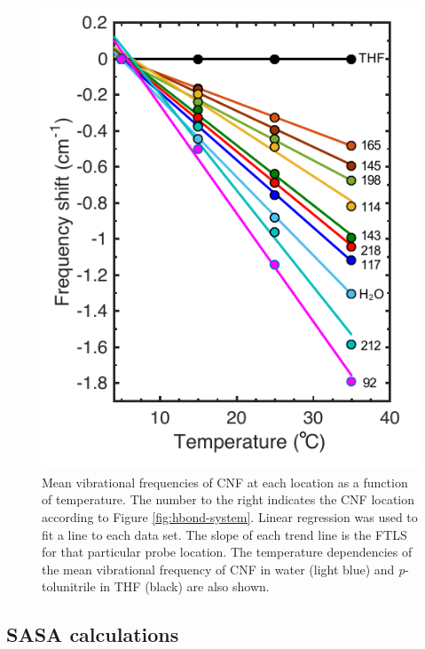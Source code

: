 \begin{figure}
    \center
    \includegraphics[width=\single]{figures-gfp-hbond/FTLS.pdf}
    \caption{
        Mean vibrational frequencies of CNF at each location as a function of temperature. 
        The number to the right indicates the CNF location according to Figure \ref{fig:hbond-system}. 
        Linear regression was used to fit a line to each data set. 
        The slope of each trend line is the FTLS for that particular probe location. 
        The temperature dependencies of the mean vibrational frequency of CNF in water (light blue) and \emph{p}-tolunitrile in THF (black) are also shown.
    }
    \label{fig:hbond-ftls}
\end{figure}

\subsection{SASA calculations}

